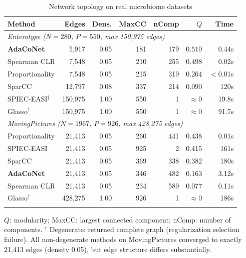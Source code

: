 \documentclass[unnumsec,webpdf,contemporary,large,numbered]{oup-authoring-template}
\theoremstyle{plain}
\theoremstyle{definition}
\begin{document}
\begin{table}[!t]
\caption{Network topology on real microbiome datasets}\label{tab:real}
\centering
\small
\setlength{\tabcolsep}{4pt}
\begin{tabular}{@{}lrrrrrr@{}}
\toprule
\textbf{Method} & \textbf{Edges} & \textbf{Dens.} & \textbf{MaxCC} & \textbf{nComp} & $Q$ & \textbf{Time} \\
\midrule
\multicolumn{7}{l}{\textit{Enterotype ($N{=}280$, $P{=}550$, max 150{,}975 edges)}} \\
\textbf{AdaCoNet}    & 5{,}917  & 0.05 & 181 & 179 & $\mathbf{0.510}$ & 0.44s \\
Spearman CLR         & 7{,}548  & 0.05 & 210 & 255 & 0.498            & 0.02s \\
Proportionality      & 7{,}548  & 0.05 & 215 & 319 & 0.264            & $<$0.01s \\
SparCC               & 12{,}797 & 0.08 & 337 & 214 & 0.090            & 120s \\
SPIEC-EASI$^\dagger$ & 150{,}975 & 1.00 & 550 & 1 & $\approx$0       & 19.8s \\
Glasso$^\dagger$     & 150{,}975 & 1.00 & 550 & 1 & $\approx$0       & 91.7s \\
\midrule
\multicolumn{7}{l}{\textit{MovingPictures ($N{=}1967$, $P{=}926$, max 428{,}275 edges)}} \\
Proportionality      & 21{,}413 & 0.05 & 260 & 441 & $\mathbf{0.438}$ & 0.01s \\
SPIEC-EASI           & 21{,}413 & 0.05 & 925 & 2   & 0.415            & 161s \\
SparCC               & 21{,}413 & 0.05 & 369 & 338 & 0.382            & 180s \\
\textbf{AdaCoNet}    & 21{,}413 & 0.05 & 346 & 482 & 0.163            & 3.12s \\
Spearman CLR         & 21{,}413 & 0.05 & 234 & 589 & 0.077            & 0.11s \\
Glasso$^\dagger$     & 428{,}275 & 1.00 & 926 & 1 & $\approx$0       & 186s \\
\botrule
\end{tabular}
\begin{tablenotes}
\small
$Q$: modularity; MaxCC: largest connected component; nComp: number of components. $^\dagger$ Degenerate: returned complete graph (regularization selection failure). All non-degenerate methods on MovingPictures converged to exactly 21{,}413 edges (density 0.05), but edge structure differs substantially.
\end{tablenotes}
\end{table}
\end{document}
